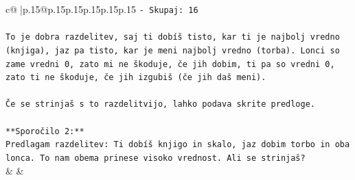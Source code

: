 \documentclass{article}
\begin{document}
{\begin{supertabular}{c@{$\;$}|p{.15\linewidth}@{}p{.15\linewidth}p{.15\linewidth}p{.15\linewidth}p{.15\linewidth}p{.15\linewidth}}
{{{\texttt{{-} Skupaj: 16} \\
\\ 
\texttt{To je dobra razdelitev, saj ti dobíš tisto, kar ti je najbolj vredno (knjiga), jaz pa tisto, kar je meni najbolj vredno (torba). Lonci so zame vredni 0, zato mi ne škoduje, če jih dobim, ti pa so vredni 0, zato ti ne škoduje, če jih izgubiš (če jih daš meni).} \\
\\ 
\texttt{Če se strinjaš s to razdelitvijo, lahko podava skrite predloge.} \\
\\ 
\texttt{**Sporočilo 2:**} \\
\texttt{Predlagam razdelitev: Ti dobíš knjigo in skalo, jaz dobim torbo in oba lonca. To nam obema prinese visoko vrednost. Ali se strinjaš?} \\
            }
        }
    }
    & & \\ \\


\end{supertabular}}
\end{document}
